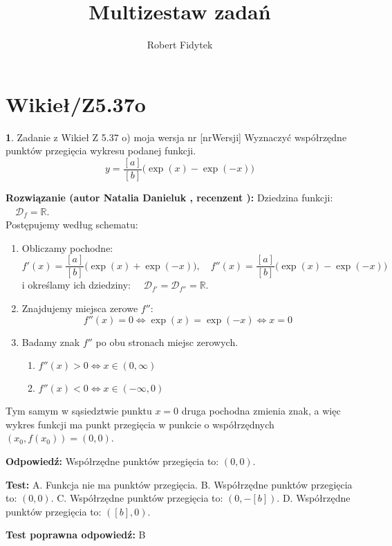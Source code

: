 \documentclass[12pt, a4paper]{article}
\title{Multizestaw zadań}
\author{Robert Fidytek}
\date{}
\theoremstyle{definition} %
\newtheorem{zad}{}
\newcommand{\kategoria}[1]{\section{#1}} %
\newcommand{\zadStart}[1]{\begin{zad}#1\newline} %
\newcommand{\zadStop}{\end{zad}}   %
\newcommand{\rozwStart}[2]{\noindent \textbf{Rozwiązanie (autor #1 , recenzent #2): }\newline} %
\newcommand{\rozwStop}{\newline}                                            %
\newcommand{\odpStart}{\noindent \textbf{Odpowiedź:}\newline}    %
\newcommand{\odpStop}{\newline}                                             %
\newcommand{\testStart}{\noindent \textbf{Test:}\newline} %
\newcommand{\testStop}{\newline} %
\newcommand{\kluczStart}{\noindent \textbf{Test poprawna odpowiedź:}\newline} %
\newcommand{\kluczStop}{\newline} %
\begin{document}
\maketitle

\kategoria{Wikieł/Z5.37o}

\zadStart{Zadanie z Wikieł Z 5.37 o) moja wersja nr [nrWersji]}
Wyznaczyć współrzędne punktów przegięcia wykresu podanej funkcji.
$$y = \frac{[a]}{[b]}\big(\exp(x) - \exp(-x)\big)$$
\zadStop

\rozwStart{Natalia Danieluk}{}
Dziedzina funkcji: $\quad \mathcal{D}_f=\mathbb{R}$. \\
Postępujemy według schematu:
\begin{enumerate}
\item Obliczamy pochodne: 
$$f'(x) = \frac{[a]}{[b]}\big(\exp(x) + \exp(-x)\big),\quad f''(x) = \frac{[a]}{[b]}\big(\exp(x) - \exp(-x)\big)$$
i określamy ich dziedziny: $\quad \mathcal{D}_{f'}=\mathcal{D}_{f''}=\mathbb{R}$. \\
\item Znajdujemy miejsca zerowe $f''$: 
$$f''(x)=0 \Leftrightarrow \exp(x)=\exp(-x) \Leftrightarrow x=0$$
\item Badamy znak $f''$ po obu stronach miejsc zerowych. \\
	\begin{enumerate}
	\item $f''(x) > 0 \Leftrightarrow x \in (0,\infty)$\\
	\item $f''(x) < 0 \Leftrightarrow x \in (-\infty,0)$
	\end{enumerate}
\end{enumerate}
Tym samym w sąsiedztwie punktu $x=0$ druga pochodna zmienia znak, a więc wykres funkcji ma punkt przegięcia w punkcie o współrzędnych $(x_0,f(x_0)) = (0,0)$.
\rozwStop

\odpStart
Współrzędne punktów przegięcia to: $(0,0)$.
\odpStop

\testStart
A. Funkcja nie ma punktów przegięcia.
B. Współrzędne punktów przegięcia to: $(0,0)$.
C. Współrzędne punktów przegięcia to: $(0,-[b])$.
D. Współrzędne punktów przegięcia to: $([b],0)$.
\testStop

\kluczStart
B
\kluczStop
\end{document}
